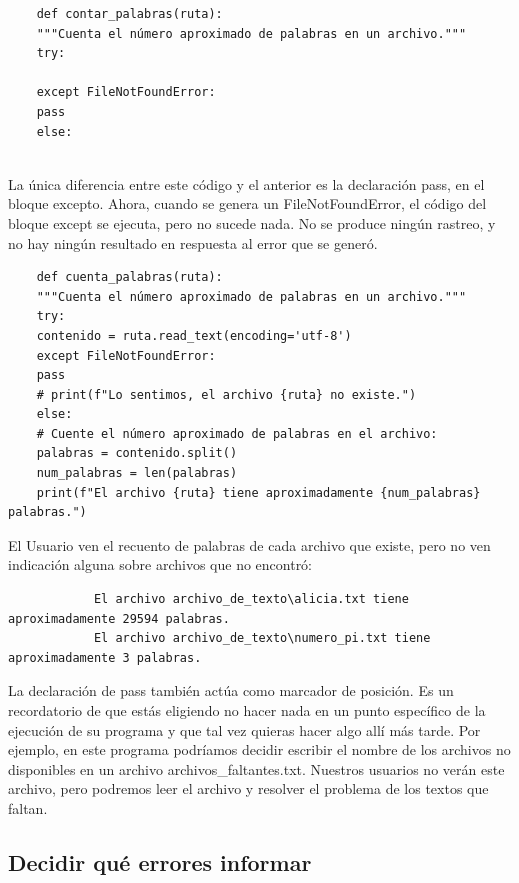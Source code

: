 \begin{lstlisting}
	def contar_palabras(ruta):
	"""Cuenta el número aproximado de palabras en un archivo."""
	try:
	
	except FileNotFoundError:
	pass
	else:
	
\end{lstlisting}

La única diferencia entre este código y el anterior es la declaración  {\ttfamily pass}, en el bloque excepto. Ahora, cuando se genera un {\ttfamily FileNotFoundError}, el código del bloque {\ttfamily except} se ejecuta, pero no sucede nada. No se produce ningún rastreo, y no hay ningún resultado en respuesta al error que se generó. 



\begin{lstlisting}
	def cuenta_palabras(ruta):
	"""Cuenta el número aproximado de palabras en un archivo."""
	try:
	contenido = ruta.read_text(encoding='utf-8')
	except FileNotFoundError:
	pass
	# print(f"Lo sentimos, el archivo {ruta} no existe.")
	else:
	# Cuente el número aproximado de palabras en el archivo:
	palabras = contenido.split()
	num_palabras = len(palabras)
	print(f"El archivo {ruta} tiene aproximadamente {num_palabras} palabras.")
\end{lstlisting}

El Usuario ven el recuento de palabras de cada archivo que existe, pero no ven indicación alguna sobre archivos 
que no encontró:

{\ttfamily\scriptsize\scriptsize 
	\hspace{-0.65cm} \vspace{-0.3cm}	
	{\color{blue} 	
		\begin{verbatim}
			El archivo archivo_de_texto\alicia.txt tiene aproximadamente 29594 palabras.
			El archivo archivo_de_texto\numero_pi.txt tiene aproximadamente 3 palabras.
		\end{verbatim}
}}

La declaración de  {\ttfamily pass} también actúa como marcador de posición. Es un recordatorio de que
estás eligiendo no hacer nada en un punto específico de la ejecución de su programa
y que tal vez quieras hacer algo allí más tarde. Por ejemplo, en este programa podríamos decidir escribir el nombre de los archivos no disponibles en un archivo {\ttfamily archivos\_faltantes.txt}. Nuestros usuarios no verán este archivo, pero podremos leer el archivo y resolver el problema de los textos que faltan.


\subsection{Decidir qué errores informar}

